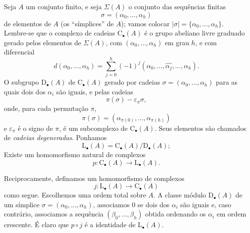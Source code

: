 \begin{env}[11.8.1]
\label{0.11.8.1}
Seja $A$ um conjunto finito, e seja $\Sigma(A)$ o conjunto das sequências
finitas
\[
  \sigma=(\alpha_0,\ldots,\alpha_h)
\]
de elementos de $A$ (os ``símplices'' de $A$); vamos colocar
$|\sigma|=\{\alpha_0,\ldots,\alpha_h\}$.
Lembre-se que o complexo de cadeias $\mathrm{C}_\bullet(A)$ é o grupo abeliano
livre graduado gerado pelos elementos de $\Sigma(A)$, com
$(\alpha_0,\ldots,\alpha_h)$ em grau $h$, e com diferencial
\[
  d(\alpha_0,\ldots,\alpha_h)
  =
  \sum_{j=0}^{h}(-1)^j
  (\alpha_0,\ldots,\widehat{\alpha_j},\ldots,\alpha_h).
\]
O subgrupo $\mathrm{D}_\bullet(A)$ de $\mathrm{C}_\bullet(A)$ gerado
por cadeias $\sigma=(\alpha_0,\ldots,\alpha_h)$ para as quais dois dos
$\alpha_i$ são iguais, e pelas cadeias
\[
  \pi(\sigma)-\varepsilon_\pi\sigma,
\]
onde, para cada permutação $\pi$,
\[
  \pi(\sigma)
  =
  (\alpha_{\pi(0)},\ldots,\alpha_{\pi(h)})
\]
e $\varepsilon_\pi$ é o signo de $\pi$, é um subcomplexo de
$\mathrm{C}_\bullet(A)$.
Seus elementos são chamados de \emph{cadeias degeneradas}.
Ponhamos
\[
  \mathrm{L}_\bullet(A)
  =
  \mathrm{C}_\bullet(A)/\mathrm{D}_\bullet(A);
\]
Existe um homomorfismo natural de complexos
\[
  p:\mathrm{C}_\bullet(A)\longrightarrow\mathrm{L}_\bullet(A).
\]

Reciprocamente, definamos um homomorfismo de complexos
\[
  j:\mathrm{L}_\bullet(A)\longrightarrow\mathrm{C}_\bullet(A)
\]
como segue.
Escolhemos uma ordem total sobre $A$.
A classe módulo $\mathrm{D}_\bullet(A)$ de um símplice
$\sigma=(\alpha_0,\ldots,\alpha_h)$, associamos $0$ se dois dos
$\alpha_i$ são iguais e, caso contrário, associamos a sequência
$(\beta_0,\ldots,\beta_h)$ obtida ordenando os $\alpha_i$ em
ordem crescente.
É claro que $p\circ j$ é a identidade de
$\mathrm{L}_\bullet(A)$.
\end{env}

